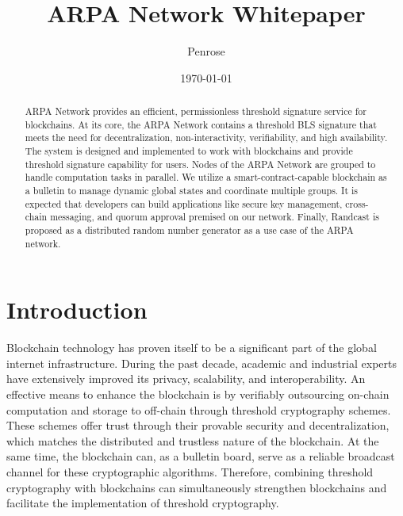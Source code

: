 \documentclass[11pt]{article}
\title{ARPA Network Whitepaper}
\author{Penrose}
\date{\today}
\begin{document}
\maketitle

\begin{abstract}
ARPA Network provides an efficient, permissionless threshold signature service for blockchains. At its core, the ARPA Network contains a threshold BLS signature that meets the need for decentralization, non-interactivity, verifiability, and high availability. The system is designed and implemented to work with blockchains and provide threshold signature capability for users. Nodes of the ARPA Network are grouped to handle computation tasks in parallel. We utilize a smart-contract-capable blockchain as a bulletin to manage dynamic global states and coordinate multiple groups. It is expected that developers can build applications like secure key management, cross-chain messaging, and quorum approval premised on our network. Finally, Randcast is proposed as a distributed random number generator as a use case of the ARPA network. 

\end{abstract}

\section{Introduction}
Blockchain technology has proven itself to be a significant part of the global internet infrastructure. During the past decade, academic and industrial experts have extensively improved its privacy, scalability, and interoperability. An effective means to enhance the blockchain is by verifiably outsourcing on-chain computation and storage to off-chain through threshold cryptography schemes. These schemes offer trust through their provable security and decentralization, which matches the distributed and trustless nature of the blockchain. At the same time, the blockchain can, as a bulletin board, serve as a reliable broadcast channel for these cryptographic algorithms. Therefore, combining threshold cryptography with blockchains can simultaneously strengthen blockchains and facilitate the implementation of threshold cryptography.
\end{document}
